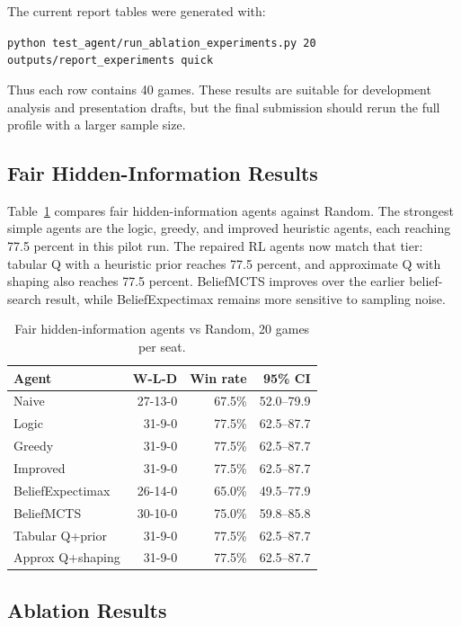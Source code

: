 \documentclass[10pt,twocolumn]{article}
\begin{document}
The current report tables were generated with:
\begin{center}
\texttt{python test\_agent/run\_ablation\_experiments.py 20 outputs/report\_experiments quick}
\end{center}
Thus each row contains 40 games. These results are suitable for development
analysis and presentation drafts, but the final submission should rerun the
full profile with a larger sample size.

\subsection{Fair Hidden-Information Results}

Table~\ref{tab:fair} compares fair hidden-information agents against Random.
The strongest simple agents are the logic, greedy, and improved heuristic
agents, each reaching 77.5 percent in this pilot run. The repaired RL agents
now match that tier: tabular Q with a heuristic prior reaches 77.5 percent,
and approximate Q with shaping also reaches 77.5 percent. BeliefMCTS improves
over the earlier belief-search result, while BeliefExpectimax remains more
sensitive to sampling noise.

\begin{table}[t]
\centering
\caption{Fair hidden-information agents vs Random, 20 games per seat.}
\label{tab:fair}
\begin{tabular}{lrrr}
\toprule
Agent & W-L-D & Win rate & 95\% CI\\
\midrule
Naive & 27-13-0 & 67.5\% & 52.0--79.9\\
Logic & 31-9-0 & 77.5\% & 62.5--87.7\\
Greedy & 31-9-0 & 77.5\% & 62.5--87.7\\
Improved & 31-9-0 & 77.5\% & 62.5--87.7\\
BeliefExpectimax & 26-14-0 & 65.0\% & 49.5--77.9\\
BeliefMCTS & 30-10-0 & 75.0\% & 59.8--85.8\\
Tabular Q+prior & 31-9-0 & 77.5\% & 62.5--87.7\\
Approx Q+shaping & 31-9-0 & 77.5\% & 62.5--87.7\\
\bottomrule
\end{tabular}
\end{table}

\subsection{Ablation Results}
\end{document}

